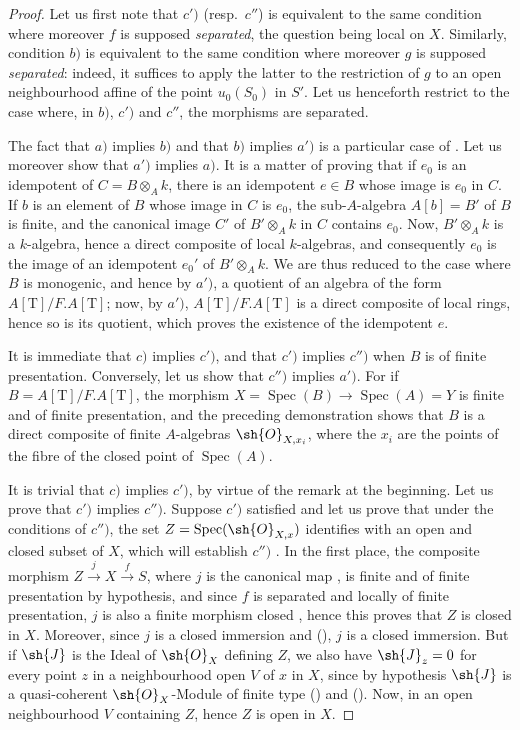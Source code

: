 \begin{proof}
Let us first note that $c')$ (resp.\ $c''$) is equivalent to the same condition where moreover $f$ is supposed \emph{separated}, the question being local on $X$.
Similarly, condition $b)$ is equivalent to the same condition where moreover $g$ is supposed \emph{separated}:
indeed, it suffices to apply the latter to the restriction of $g$ to an open neighbourhood affine of the point $u_0(S_0)$ in $S'$.
Let us henceforth restrict to the case where, in $b)$, $c')$ and $c''$, the morphisms are separated.

The fact that $a)$ implies $b)$ and that $b)$ implies $a')$ is a particular case of .
Let us moreover show that $a')$ implies $a)$.
It is a matter of proving that if $e_0$ is an idempotent of $C=B\otimes_A k$, there is an idempotent $e\in B$ whose image is $e_0$ in $C$.
If $b$ is an element of $B$ whose image in $C$ is $e_0$, the sub-$A$-algebra $A[b]=B'$ of $B$ is finite, and the canonical image $C'$ of $B'\otimes_A k$ in $C$ contains $e_0$.
Now, $B'\otimes_A k$ is a $k$-algebra, hence a direct composite of local $k$-algebras, and consequently $e_0$ is the image of an idempotent $e_0'$ of $B'\otimes_A k$.
We are thus reduced to the case where $B$ is monogenic, and hence by $a')$, a quotient of an algebra of the form $A[\mathrm{T}]/F.A[\mathrm{T}]$;
now, by $a')$, $A[\mathrm{T}]/F.A[\mathrm{T}]$ is a direct composite of local rings, hence so is its quotient, which proves the existence of the idempotent $e$.

It is immediate that $c)$ implies $c')$, and that $c')$ implies $c'')$ when $B$ is of finite presentation.
Conversely, let us show that $c'')$ implies $a')$.
For if $B=A[\mathrm{T}]/F.A[\mathrm{T}]$, the morphism $X=\operatorname{Spec}(B)\to\operatorname{Spec}(A)=Y$ is finite and of finite presentation, and the preceding demonstration shows that $B$ is a direct composite of finite $A$-algebras $\sh{O}_{X,x_i}$, where the $x_i$ are the points of the fibre of the closed point of $\operatorname{Spec}(A)$.

It is trivial that $c)$ implies $c')$, by virtue of the remark at the beginning.
Let us prove that $c')$ implies $c'')$.
Suppose $c')$ satisfied and let us prove that under the conditions of $c'')$, the set $Z=\operatorname{Spec}(\sh{O}_{X,x})$ identifies with an open and closed subset of $X$, which will establish $c'')$ .
In the first place, the composite morphism $Z\xrightarrow{j}X\xrightarrow{f}S$, where $j$ is the canonical map , is finite and of finite presentation by hypothesis, and since $f$ is separated and locally of finite presentation, $j$ is also a finite morphism closed , hence this proves that $Z$ is closed in $X$.
Moreover, since $j$ is a closed immersion  and (), $j$ is a closed immersion.
But if $\sh{J}$ is the Ideal of $\sh{O}_X$ defining $Z$, we also have $\sh{J}_z=0$ for every point $z$ in a neighbourhood open $V$ of $x$ in $X$, since by hypothesis $\sh{J}$ is a quasi-coherent $\sh{O}_X$-Module of finite type () and ().
Now, in an open neighbourhood $V$ containing $Z$, hence $Z$ is open in $X$.


\end{proof}
